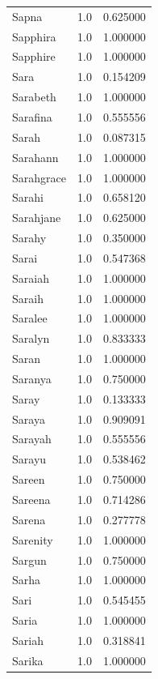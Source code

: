 \documentclass[
  letterpaper,
  DIV=11,
  numbers=noendperiod]{scrreprt}
\begin{document}
\begin{tabular}{lrr}
Sapna           &   1.0 &   0.625000 \\
Sapphira        &   1.0 &   1.000000 \\
Sapphire        &   1.0 &   1.000000 \\
Sara            &   1.0 &   0.154209 \\
Sarabeth        &   1.0 &   1.000000 \\
Sarafina        &   1.0 &   0.555556 \\
Sarah           &   1.0 &   0.087315 \\
Sarahann        &   1.0 &   1.000000 \\
Sarahgrace      &   1.0 &   1.000000 \\
Sarahi          &   1.0 &   0.658120 \\
Sarahjane       &   1.0 &   0.625000 \\
Sarahy          &   1.0 &   0.350000 \\
Sarai           &   1.0 &   0.547368 \\
Saraiah         &   1.0 &   1.000000 \\
Saraih          &   1.0 &   1.000000 \\
Saralee         &   1.0 &   1.000000 \\
Saralyn         &   1.0 &   0.833333 \\
Saran           &   1.0 &   1.000000 \\
Saranya         &   1.0 &   0.750000 \\
Saray           &   1.0 &   0.133333 \\
Saraya          &   1.0 &   0.909091 \\
Sarayah         &   1.0 &   0.555556 \\
Sarayu          &   1.0 &   0.538462 \\
Sareen          &   1.0 &   0.750000 \\
Sareena         &   1.0 &   0.714286 \\
Sarena          &   1.0 &   0.277778 \\
Sarenity        &   1.0 &   1.000000 \\
Sargun          &   1.0 &   0.750000 \\
Sarha           &   1.0 &   1.000000 \\
Sari            &   1.0 &   0.545455 \\
Saria           &   1.0 &   1.000000 \\
Sariah          &   1.0 &   0.318841 \\
Sarika          &   1.0 &   1.000000 \\

\end{tabular}
\end{document}
